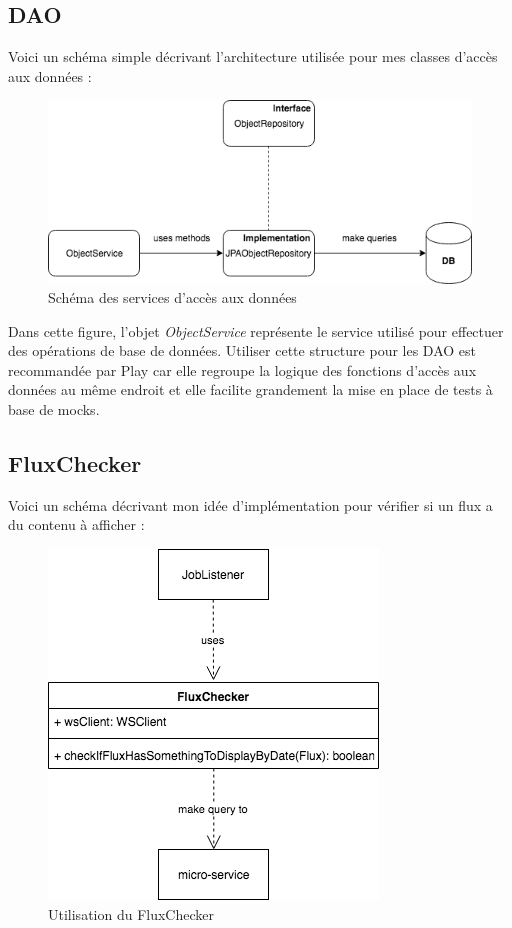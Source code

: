 \documentclass[french]{article}
\begin{document}
\newpage
\subsection{DAO}
Voici un schéma simple décrivant l'architecture utilisée pour mes classes d'accès aux données :

\begin{figure}[h]
	\centering	
	\includegraphics[width=0.8\linewidth]{schemas/dao_schema.png}%
	\caption{Schéma des services d'accès aux données}
\end{figure}

Dans cette figure, l'objet \textit{ObjectService} représente le service utilisé pour effectuer des opérations de base de données. Utiliser cette structure pour les DAO est recommandée par Play car elle regroupe la logique des fonctions d'accès aux données au même endroit et elle facilite grandement la mise en place de tests à base de mocks. 

\subsection{FluxChecker}

Voici un schéma décrivant mon idée d'implémentation pour vérifier si un flux a du contenu à afficher :

\begin{figure}[h]
	\centering	
	\includegraphics[width=0.5\linewidth]{schemas/fluxchecker.png}%
	\caption{Utilisation du FluxChecker}
\end{figure}
\end{document}
